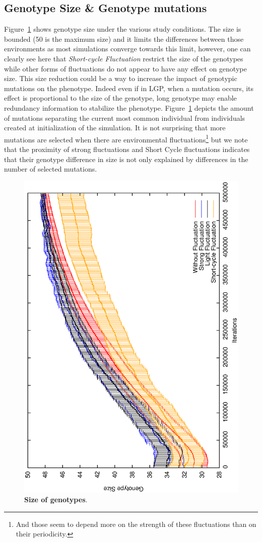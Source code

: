 \subsection{Genotype Size \& Genotype mutations}

Figure~\ref{fig:Size} shows genotype size under the various study conditions. The size is bounded (50 is the maximum size) and it limits the differences between those environments as most simulations converge towards this limit, however, one can clearly see here that \emph{Short-cycle Fluctuation} restrict the size of the genotypes while other forms of fluctuations do not appear to have any effect on genotype size. This size reduction could be a way to increase the impact of genotypic mutations on the phenotype. Indeed even if in LGP, when a mutation occurs, its effect is proportional to the size of the genotype, long genotype may enable redundancy information to stabilize the phenotype. Figure~\ref{fig:Size} depicts the amount of mutations separating the current most common individual from individuals created at initialization of the simulation. It is not surprising that more mutations are selected when there are environmental fluctuations\footnote{And those seem to depend more on the strength of these fluctuations than on their periodicity.} but we note that the proximity of strong fluctuations and Short Cycle fluctuations indicates that their genotype difference in size is not only explained by differences in the number of selected mutations.


\begin{figure}[h]
\centering
\includegraphics[width=0.7\columnwidth, angle =-90 ]{img/Size}
\caption{\textbf{Size of genotypes}. 
}
\label{fig:Size}
\end{figure}

